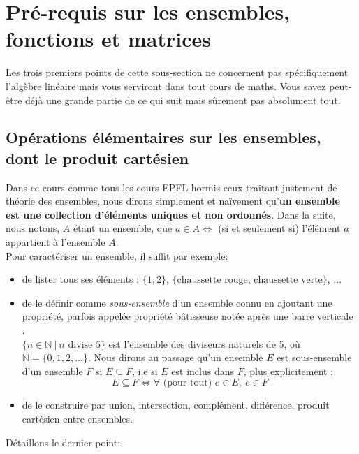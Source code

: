 \chapter{Pré-requis sur les ensembles, fonctions et matrices}

Les trois premiers points de cette sous-section ne concernent pas spécifiquement l'algèbre linéaire mais vous serviront dans tout cours de maths. Vous savez peut-être déjà une grande partie de ce qui suit mais sûrement pas absolument tout.

\section{Opérations élémentaires sur les ensembles, dont le produit cartésien}
Dans ce cours comme tous les cours EPFL hormis ceux traitant justement de théorie des ensembles, nous dirons simplement et naïvement qu'\textbf{un ensemble est une collection d'éléments uniques et non ordonnés}. Dans la suite, nous notons, $A$ étant un ensemble, que $a \in A \iff$ (si et seulement si) l'élément $a$ appartient à l'ensemble $A$.\\

\noindent Pour caractériser un ensemble, il suffit par exemple:
\begin{itemize}
    \item de lister tous ses éléments : $\{1, 2\}$, $\{\text{chaussette rouge, chaussette verte}\}$, ...
    \item de le définir comme \textit{sous-ensemble} d'un ensemble connu en ajoutant une propriété, parfois appelée propriété bâtisseuse notée après une barre verticale : \\ 
    $\{ n \in \mathbb{N} \ | \ n \text{ divise 5}\}$ est l'ensemble des diviseurs naturels de 5, où $\mathbb{N} = \{0, 1, 2, ...\}$. Nous dirons au passage qu'un ensemble $E$ est sous-ensemble d'un ensemble $F$ si $E \subseteq F$, i.e si $E$ est inclus dans $F$, plus explicitement :
    $$E \subseteq F \iff \forall \text{ (pour tout) } e \in E, \ e \in F$$
    
    \item de le construire par union, intersection, complément, différence, produit cartésien entre ensembles.
\end{itemize}
Détaillons le dernier point: 

